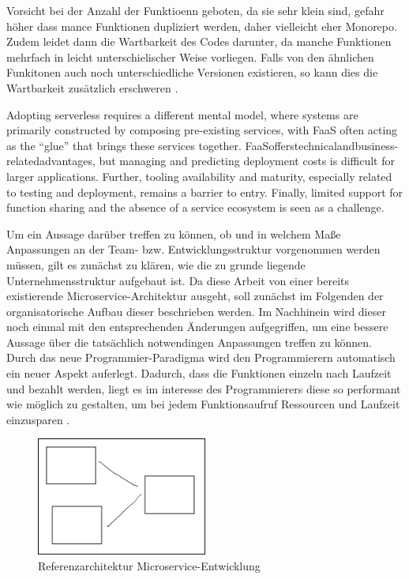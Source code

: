 \documentclass[11pt]{article}
\begin{document}
Vorsicht bei der Anzahl der Funktioenn geboten, da sie sehr klein sind, gefahr höher dass mance Funktionen dupliziert werden, daher vielleicht eher Monorepo. Zudem leidet dann die Wartbarkeit des Codes darunter, da manche Funktionen mehrfach in leicht unterschielischer Weise vorliegen. Falls von den ähnlichen Funkitonen auch noch unterschiedliche Versionen existieren, so kann dies die Wartbarkeit zusätzlich erschweren \cite{racicot2019quality}.  



Adopting serverless requires a diﬀerent mental model, where systems are primarily constructed by composing pre-existing services, with FaaS often acting as the “glue” that brings these services together. FaaSoﬀerstechnicalandbusiness-relatedadvantages, but managing and predicting deployment costs is diﬃcult for larger applications. Further, tooling availability and maturity, especially related to testing and deployment, remains a barrier to entry. Finally, limited support for function sharing and the absence of a service ecosystem is seen as a challenge.  \cite{leitner2019mixed}

Um ein Aussage darüber treffen zu können, ob und in welchem Maße Anpassungen an der Team- bzw. Entwicklungsstruktur vorgenommen werden müssen, gilt es zunächst zu klären, wie die zu grunde liegende Unternehmensstruktur aufgebaut ist. Da diese Arbeit von einer bereits existierende Microservice-Architektur ausgeht, soll zunächst im Folgenden der organisatorische Aufbau dieser beschrieben werden. Im Nachhinein wird dieser noch einmal mit den entsprechenden Änderungen aufgegriffen, um eine bessere Aussage über die tatsächlich notwendingen Anpassungen treffen zu können.
Durch das neue Programmier-Paradigma wird den Programmierern automatisch ein neuer Aspekt auferlegt. Dadurch, dass die Funktionen einzeln nach Laufzeit und bezahlt werden, liegt es im interesse des Programmierers diese so performant wie möglich zu gestalten, um bei jedem Funktionsaufruf Ressourcen und Laufzeit einzusparen \cite{shafiei2020serverless}. 

\begin{figure}[h]
\caption{Referenzarchitektur Microservice-Entwicklung}
\centering
\includegraphics[width=0.5\textwidth]{test}
\end{figure}
\end{document}
